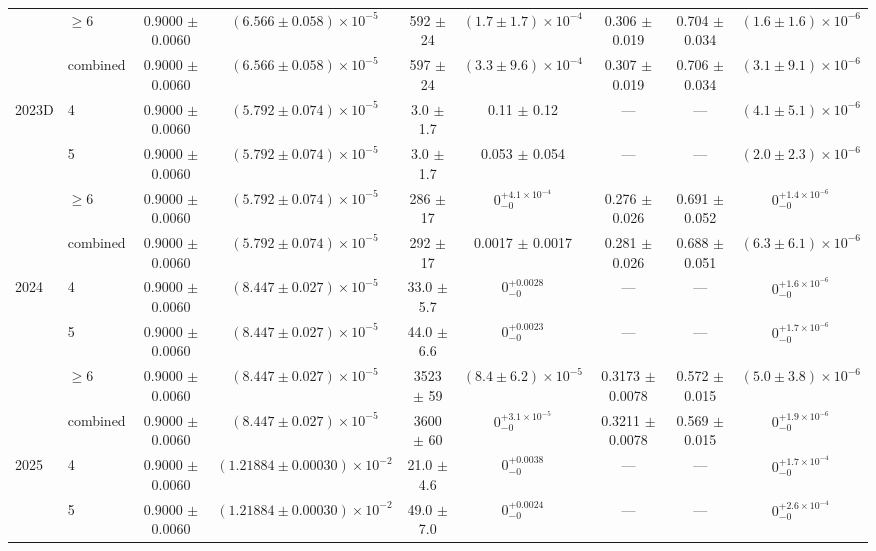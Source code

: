 \begin{table}
\begin{tiny}
\begin{tabular}{llccccccc}
 & $\geq 6$ & 0.9000 $\pm$ 0.0060 & $(6.566 \pm 0.058) \times 10^{-5}$ & 592 $\pm$ 24 & $(1.7 \pm 1.7) \times 10^{-4}$ & 0.306 $\pm$ 0.019 & 0.704 $\pm$ 0.034 & $(1.6 \pm 1.6) \times 10^{-6}$ \\
 & combined & 0.9000 $\pm$ 0.0060 & $(6.566 \pm 0.058) \times 10^{-5}$ & 597 $\pm$ 24 & $(3.3 \pm 9.6) \times 10^{-4}$ & 0.307 $\pm$ 0.019 & 0.706 $\pm$ 0.034 & $(3.1 \pm 9.1) \times 10^{-6}$ \\
\hline
\multirow{4}{*}{2023D} & 4 & 0.9000 $\pm$ 0.0060 & $(5.792 \pm 0.074) \times 10^{-5}$ & 3.0 $\pm$ 1.7 & 0.11 $\pm$ 0.12 & --- & --- & $(4.1 \pm 5.1) \times 10^{-6}$ \\
 & 5 & 0.9000 $\pm$ 0.0060 & $(5.792 \pm 0.074) \times 10^{-5}$ & 3.0 $\pm$ 1.7 & 0.053 $\pm$ 0.054 & --- & --- & $(2.0 \pm 2.3) \times 10^{-6}$ \\
 & $\geq 6$ & 0.9000 $\pm$ 0.0060 & $(5.792 \pm 0.074) \times 10^{-5}$ & 286 $\pm$ 17 & $0^{+4.1 \times 10^{-4}}_{-0}$ & 0.276 $\pm$ 0.026 & 0.691 $\pm$ 0.052 & $0^{+1.4 \times 10^{-6}}_{-0}$ \\
 & combined & 0.9000 $\pm$ 0.0060 & $(5.792 \pm 0.074) \times 10^{-5}$ & 292 $\pm$ 17 & 0.0017 $\pm$ 0.0017 & 0.281 $\pm$ 0.026 & 0.688 $\pm$ 0.051 & $(6.3 \pm 6.1) \times 10^{-6}$ \\
\hline
\multirow{4}{*}{2024} & 4 & 0.9000 $\pm$ 0.0060 & $(8.447 \pm 0.027) \times 10^{-5}$ & 33.0 $\pm$ 5.7 & $0^{+0.0028}_{-0}$ & --- & --- & $0^{+1.6 \times 10^{-6}}_{-0}$ \\
 & 5 & 0.9000 $\pm$ 0.0060 & $(8.447 \pm 0.027) \times 10^{-5}$ & 44.0 $\pm$ 6.6 & $0^{+0.0023}_{-0}$ & --- & --- & $0^{+1.7 \times 10^{-6}}_{-0}$ \\
 & $\geq 6$ & 0.9000 $\pm$ 0.0060 & $(8.447 \pm 0.027) \times 10^{-5}$ & 3523 $\pm$ 59 & $(8.4 \pm 6.2) \times 10^{-5}$ & 0.3173 $\pm$ 0.0078 & 0.572 $\pm$ 0.015 & $(5.0 \pm 3.8) \times 10^{-6}$ \\
 & combined & 0.9000 $\pm$ 0.0060 & $(8.447 \pm 0.027) \times 10^{-5}$ & 3600 $\pm$ 60 & $0^{+3.1 \times 10^{-5}}_{-0}$ & 0.3211 $\pm$ 0.0078 & 0.569 $\pm$ 0.015 & $0^{+1.9 \times 10^{-6}}_{-0}$ \\
\hline
\multirow{4}{*}{2025} & 4 & 0.9000 $\pm$ 0.0060 & $(1.21884 \pm 0.00030) \times 10^{-2}$ & 21.0 $\pm$ 4.6 & $0^{+0.0038}_{-0}$ & --- & --- & $0^{+1.7 \times 10^{-4}}_{-0}$ \\
 & 5 & 0.9000 $\pm$ 0.0060 & $(1.21884 \pm 0.00030) \times 10^{-2}$ & 49.0 $\pm$ 7.0 & $0^{+0.0024}_{-0}$ & --- & --- & $0^{+2.6 \times 10^{-4}}_{-0}$ \\

\end{tabular}
\end{tiny}
\end{table}
